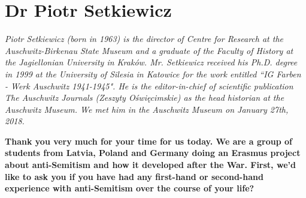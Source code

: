 \section{Dr Piotr Setkiewicz}

\textit{Piotr Setkiewicz (born in 1963) is the director of Centre for Research at the Auschwitz-Birkenau State Museum and a graduate of the Faculty of History at the Jagiellonian University in Kraków. Mr. Setkiewicz received his Ph.D. degree in 1999 at the University of Silesia in Katowice for the work entitled “IG Farben - Werk Auschwitz 1941-1945". He is the editor-in-chief of scientific publication The Auschwitz Journals (Zeszyty Oświęcimskie) as the head historian at the Auschwitz Museum. We met him in the Auschwitz Museum on January 27th, 2018.}\par 
\vspace*{2em}
\textbf{Thank you very much for your time for us today. We are a group of students from Latvia, Poland and Germany doing an Erasmus project about anti-Semitism and how it developed after the War. First, we'd like to ask you if you have had any first-hand or second-hand experience with anti-Semitism over the course of your life?}


